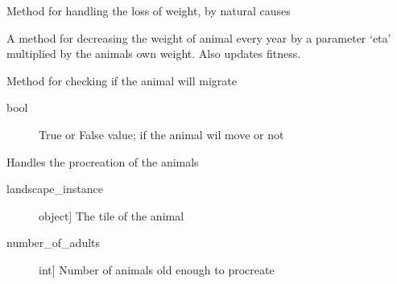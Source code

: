 \documentclass[a4paper,10pt,english]{sphinxmanual}
\begin{document}
\begin{fulllineitems}
\begin{fulllineitems}
\begin{description}
\end{description}

\end{fulllineitems}


\begin{fulllineitems}
\label{\detokenize{animals:biosim.animals.Herbivore.loss_of_weight}}
Method for handling the loss of weight, by natural causes

A method for decreasing the weight of animal every year by a parameter
`eta' multiplied by the animals own weight. Also updates fitness.

\end{fulllineitems}


\begin{fulllineitems}
\label{\detokenize{animals:biosim.animals.Herbivore.migration}}
Method for checking if the animal will migrate
\begin{description}
\item[{bool}] \leavevmode
True or False value; if the animal wil move or not

\end{description}

\end{fulllineitems}


\begin{fulllineitems}
\label{\detokenize{animals:biosim.animals.Herbivore.procreation}}
Handles the procreation of the animals
\begin{description}
\item[{landscape\_instance}] \leavevmode{[}object{]}
The tile of the animal

\item[{number\_of\_adults}] \leavevmode{[}int{]}
Number of animals old enough to procreate

\end{description}

\end{fulllineitems}


\end{fulllineitems}
\end{document}
